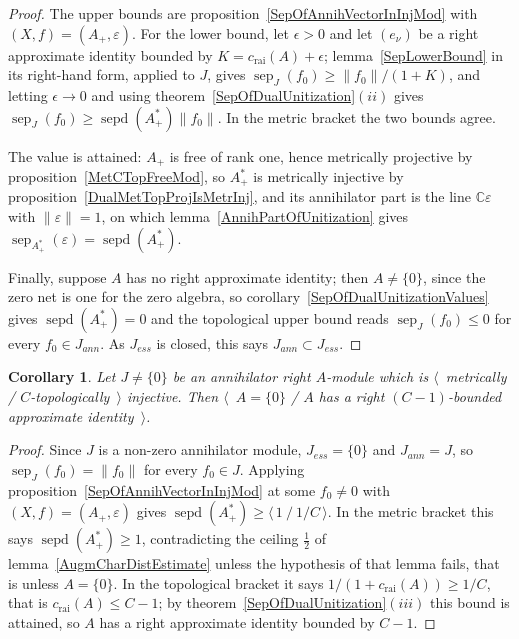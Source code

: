 \documentclass[11pt]{article}
\theoremstyle{plain}
\newtheorem{corollary}[theorem]{Corollary}
\theoremstyle{definition}
\DeclareMathOperator{\sep}{sep}
\DeclareMathOperator{\sepd}{sepd}
\newcommand{\crai}{c_{\mathrm{rai}}}
\begin{document}
\begin{proof}
The upper bounds are proposition~\ref{SepOfAnnihVectorInInjMod} with
$(X,f)=(A_+,\varepsilon)$. For the lower bound, let $\epsilon>0$ and let
${(e_\nu)}$ be a right approximate identity bounded by $K=\crai(A)+\epsilon$;
lemma~\ref{SepLowerBound} in its right-hand form, applied to $J$, gives
$\sep_J(f_0)\geq\lVert f_0\rVert/(1+K)$, and letting $\epsilon\to 0$ and using
theorem~\ref{SepOfDualUnitization}$(ii)$ gives
$\sep_J(f_0)\geq\sepd(A_+^*)\lVert f_0\rVert$. In the metric bracket the two
bounds agree.

The value is attained: $A_+$ is free of rank one, hence metrically projective by
proposition~\ref{MetCTopFreeMod}, so $A_+^*$ is metrically injective by
proposition~\ref{DualMetTopProjIsMetrInj}, and its annihilator part is the line
$\mathbb{C}\varepsilon$ with $\lVert\varepsilon\rVert=1$, on which
lemma~\ref{AnnihPartOfUnitization} gives
$\sep_{A_+^*}(\varepsilon)=\sepd(A_+^*)$.

Finally, suppose $A$ has no right approximate identity; then $A\neq \{0 \}$,
since the zero net is one for the zero algebra, so
corollary~\ref{SepOfDualUnitizationValues} gives $\sepd(A_+^*)=0$ and the
topological upper bound reads $\sep_J(f_0)\leq 0$ for every $f_0\in J_{ann}$. As
$J_{ess}$ is closed, this says $J_{ann}\subset J_{ess}$.
\end{proof}

\begin{corollary}\label{InjAnnihModApprIdent}
Let $J\neq \{0 \}$ be an annihilator right $A$-module which is
$\langle$~metrically / $C$-topologically~$\rangle$ injective. Then
$\langle$~$A= \{0 \}$ / $A$ has a right $(C-1)$-bounded approximate
identity~$\rangle$.
\end{corollary}

\begin{proof}
Since $J$ is a non-zero annihilator module, $J_{ess}= \{0 \}$ and $J_{ann}=J$, so
$\sep_J(f_0)=\lVert f_0\rVert$ for every $f_0\in J$. Applying
proposition~\ref{SepOfAnnihVectorInInjMod} at some $f_0\neq 0$ with
$(X,f)=(A_+,\varepsilon)$ gives
$\sepd(A_+^*)\geq\langle\,1\ /\ 1/C\,\rangle$. In the metric bracket this says
$\sepd(A_+^*)\geq 1$, contradicting the ceiling $\tfrac{1}{2}$ of
lemma~\ref{AugmCharDistEstimate} unless the hypothesis of that lemma fails, that
is unless $A= \{0 \}$. In the topological bracket it says
$1/(1+\crai(A))\geq 1/C$, that is $\crai(A)\leq C-1$; by
theorem~\ref{SepOfDualUnitization}$(iii)$ this bound is attained, so $A$ has a
right approximate identity bounded by $C-1$.
\end{proof}
\end{document}
